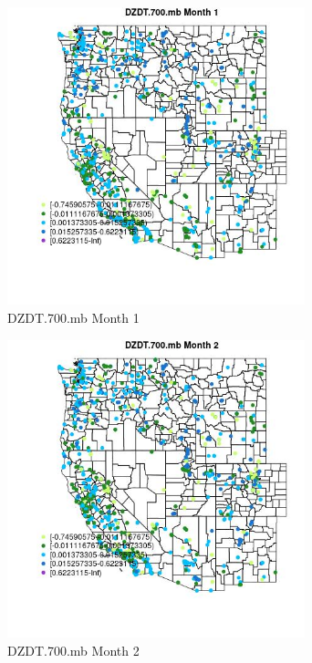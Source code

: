 \begin{figure} 
\centering  
\includegraphics[width=0.77\textwidth]{Code_Outputs/Report_ML_input_PM25_Step4_part_f_de_duplicated_aves_prioritize_24hr_obswNAs_MapObsMo1DZDT700mb.jpg} 
\caption{\label{fig:Report_ML_input_PM25_Step4_part_f_de_duplicated_aves_prioritize_24hr_obswNAsMapObsMo1DZDT700mb}DZDT.700.mb Month 1} 
\end{figure} 
 

\begin{figure} 
\centering  
\includegraphics[width=0.77\textwidth]{Code_Outputs/Report_ML_input_PM25_Step4_part_f_de_duplicated_aves_prioritize_24hr_obswNAs_MapObsMo2DZDT700mb.jpg} 
\caption{\label{fig:Report_ML_input_PM25_Step4_part_f_de_duplicated_aves_prioritize_24hr_obswNAsMapObsMo2DZDT700mb}DZDT.700.mb Month 2} 
\end{figure} 
 

